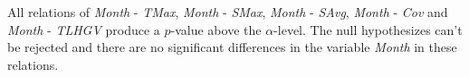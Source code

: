 All relations of \textit{Month} - \textit{TMax}, \textit{Month} - \textit{SMax}, \textit{Month} - \textit{SAvg}, \textit{Month} - \textit{Cov} and \textit{Month} - \textit{TLHGV} produce a $p$-value above the $\alpha$-level. The null hypothesizes can't be rejected and there are no significant differences in the variable \textit{Month} in these relations.
